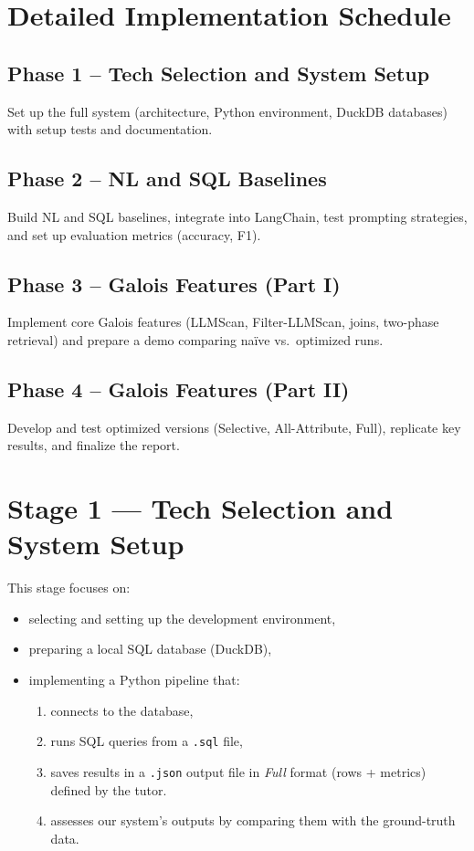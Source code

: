 \documentclass[11pt,a4paper]{article}
\begin{document}
\section{Detailed Implementation Schedule}

\subsection*{Phase 1 – Tech Selection and System Setup}
Set up the full system (architecture, Python environment, DuckDB databases) with setup tests and documentation.

\subsection*{Phase 2 – NL and SQL Baselines}
Build NL and SQL baselines, integrate into LangChain, test prompting strategies, and set up evaluation metrics (accuracy, F1).

\subsection*{Phase 3 – Galois Features (Part I)}
Implement core Galois features (LLMScan, Filter-LLMScan, joins, two-phase retrieval) and prepare a demo comparing naïve vs.\ optimized runs.

\subsection*{Phase 4 – Galois Features (Part II)}
Develop and test optimized versions (Selective, All-Attribute, Full), replicate key results, and finalize the report.


\section{Stage 1 --- Tech Selection and System Setup}

This stage focuses on:
\begin{itemize}[nosep]
  \item selecting and setting up the development environment,
  \item preparing a local SQL database (DuckDB),
  \item implementing a Python pipeline that:
    \begin{enumerate}[nosep]
      \item connects to the database,
      \item runs SQL queries from a \texttt{.sql} file,
      \item saves results in a \texttt{.json} output file in \emph{Full} format (rows + metrics) defined by the tutor.
      \item assesses our system’s outputs by comparing them with the ground-truth data.
    \end{enumerate}
\end{itemize}
\end{document}

